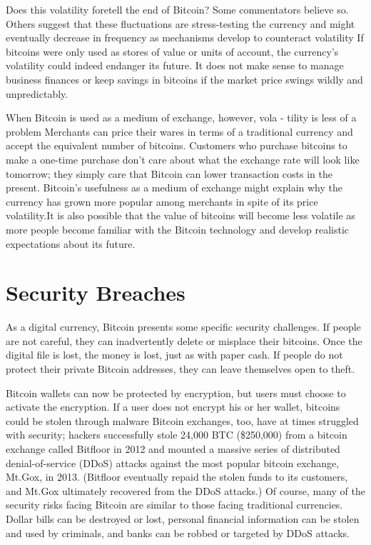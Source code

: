 Does this volatility foretell the end of Bitcoin? Some commentators
believe so. Others suggest that these fluctuations
are stress-testing the currency and might eventually decrease
in frequency as mechanisms develop to counteract volatility
If bitcoins were only used as stores of value or units of account,
the currency’s volatility could indeed endanger its future. It does
not make sense to manage business finances or keep savings in
bitcoins if the market price swings wildly and unpredictably.

When Bitcoin is used as a medium of exchange, however, vola -
tility is less of a problem Merchants can price their wares in
terms of a traditional currency and accept the equivalent number
of bitcoins. Customers who purchase bitcoins to make a one-time
purchase don’t care about what the exchange rate will look like
tomorrow; they simply care that Bitcoin can lower transaction
costs in the present. Bitcoin’s usefulness as a medium of exchange
might explain why the currency has grown more popular among
merchants in spite of its price volatility.It is also possible that
the value of bitcoins will become less volatile as more people
become familiar with the Bitcoin technology and develop realistic
expectations about its future.

\section{Security Breaches}
As a digital currency, Bitcoin presents some specific security challenges.
If people are not careful, they can inadvertently delete
or misplace their bitcoins. Once the digital file is lost, the money
is lost, just as with paper cash. If people do not protect their private
Bitcoin addresses, they can leave themselves open to theft.

Bitcoin wallets can now be protected by encryption, but users
must choose to activate the encryption. If a user does not encrypt
his or her wallet, bitcoins could be stolen through malware
Bitcoin exchanges, too, have at times struggled with security;
hackers successfully stole 24,000 BTC (\$250,000) from a bitcoin
exchange called Bitfloor in 2012 and mounted a massive series
of distributed denial-of-service (DDoS) attacks against the most
popular bitcoin exchange, Mt.Gox, in 2013. (Bitfloor eventually
repaid the stolen funds to its customers, and Mt.Gox ultimately
recovered from the DDoS attacks.) Of course, many of the security
risks facing Bitcoin are similar to those facing traditional currencies.
Dollar bills can be destroyed or lost, personal financial
information can be stolen and used by criminals, and banks can
be robbed or targeted by DDoS attacks.

